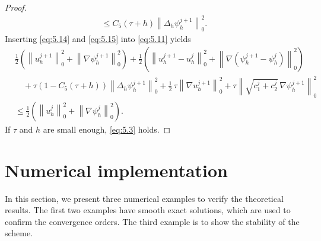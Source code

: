 \documentclass[a4paper,fleqn]{cas-sc}
\numberwithin{equation}{section}
\theoremstyle{definition}
\begin{document}
\begin{proof}
\begin{align}
  \leq
  C_{5}(\tau + h)\left\|\Delta_{h}\psi_{h}^{j+1}\right\|_{0}^{2}.
  \label{eq:5.15}
\end{align}
Inserting \eqref{eq:5.14} and \eqref{eq:5.15} into \eqref{eq:5.11} yields
\begin{align}
  &\frac{1}{2}\!\left(
    \left\|u_{h}^{j+1}\right\|_{0}^{2}
    + \left\|\nabla\psi_{h}^{j+1}\right\|_{0}^{2}
  \right)
  + \frac{1}{2}\!\left(
    \left\|u_{h}^{j+1} - u_{h}^{j}\right\|_{0}^{2}
    + \left\|\nabla(\psi_{h}^{j+1} - \psi_{h}^{j})\right\|_{0}^{2}
  \right)
  \nonumber\\
  &\quad
  + \tau\!\left(1 - C_{5}(\tau + h)\right)
    \left\|\Delta_{h}\psi_{h}^{j+1}\right\|_{0}^{2}
  + \frac{1}{2}\,\tau\left\|\nabla u_{h}^{j+1}\right\|_{0}^{2}
  + \tau\left\|\sqrt{c_{1}^{j} + c_{2}^{j}}\,\nabla\psi_{h}^{j+1}\right\|_{0}^{2}
  \nonumber\\
  &\leq
  \frac{1}{2}\!\left(
    \left\|u_{h}^{j}\right\|_{0}^{2}
    + \left\|\nabla\psi_{h}^{j}\right\|_{0}^{2}
  \right).
  \label{eq:5.16}
\end{align}
If $\tau$ and $h$ are small enough, \eqref{eq:5.3} holds.
\end{proof}

\section{Numerical implementation}
\label{sec:numerics}

In this section, we present three numerical examples to verify the theoretical results. The
first two examples have smooth exact solutions, which are used to confirm the convergence
orders. The third example is to show the stability of the scheme.
\end{document}
